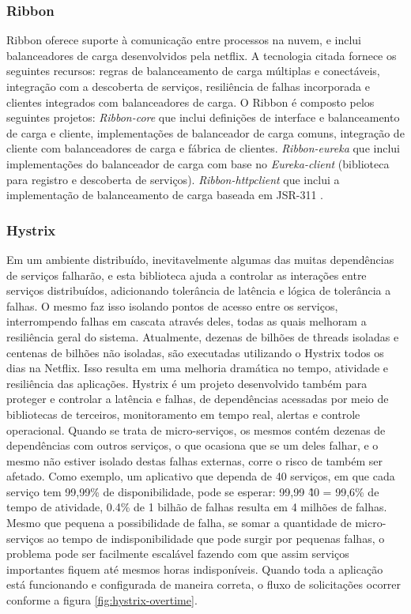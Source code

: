 \documentclass[journal]{IEEEtran}
\begin{document}
\subsubsection{Ribbon}
Ribbon oferece suporte à comunicação entre processos na nuvem, e inclui balanceadores de carga desenvolvidos pela netflix. A tecnologia citada fornece os seguintes recursos: regras de balanceamento de carga múltiplas e conectáveis, integração com a descoberta de serviços, resiliência de falhas incorporada e clientes integrados com balanceadores de carga. O Ribbon é composto pelos seguintes projetos: \emph{Ribbon-core} que inclui definições de interface e balanceamento de carga e cliente, implementações de balanceador de carga comuns, integração de cliente com balanceadores de carga e fábrica de clientes. \emph{Ribbon-eureka} que inclui implementações do balanceador de carga com base no \emph{Eureka-client} (biblioteca para registro e descoberta de serviços). \emph{Ribbon-httpclient} que inclui a implementação de balanceamento de carga baseada em JSR-311 \cite{netflix2016Ribbon}.

\subsubsection{Hystrix}
Em um ambiente distribuído, inevitavelmente algumas das muitas dependências de serviços falharão, e esta biblioteca ajuda a controlar as interações entre serviços distribuídos, adicionando tolerância de latência e lógica de tolerância a falhas. O mesmo faz isso isolando pontos de acesso entre os serviços, interrompendo falhas em cascata através deles, todas as quais melhoram a resiliência geral do sistema. Atualmente, dezenas de bilhões de threads isoladas e centenas de bilhões não isoladas, são executadas utilizando o Hystrix todos os dias na Netflix. Isso resulta em uma melhoria dramática no tempo, atividade e resiliência das aplicações. Hystrix é um projeto desenvolvido também para proteger e controlar a latência e falhas, de dependências acessadas por meio de bibliotecas de terceiros, monitoramento em tempo real, alertas e controle operacional. Quando se trata de micro-serviços, os mesmos contém dezenas de dependências com outros serviços, o que ocasiona que se um deles falhar, e o mesmo não estiver isolado destas falhas externas, corre o risco de também ser afetado. Como exemplo, um aplicativo que dependa de 40 serviços, em que cada serviço tem 99,99\% de disponibilidade, pode se esperar: 99,99 \^ 40 = 99,6\% de tempo de atividade, 0.4\% de 1 bilhão de falhas resulta em 4 milhões de falhas. Mesmo que pequena a possibilidade de falha, se somar a quantidade de micro-serviços ao tempo de indisponibilidade que pode surgir por pequenas falhas, o problema pode ser facilmente escalável fazendo com que assim serviços importantes fiquem até mesmos horas indisponíveis. Quando toda a aplicação está funcionando e configurada de maneira correta, o fluxo de solicitações ocorrer conforme a figura \ref{fig:hystrix-overtime}.
\end{document}
